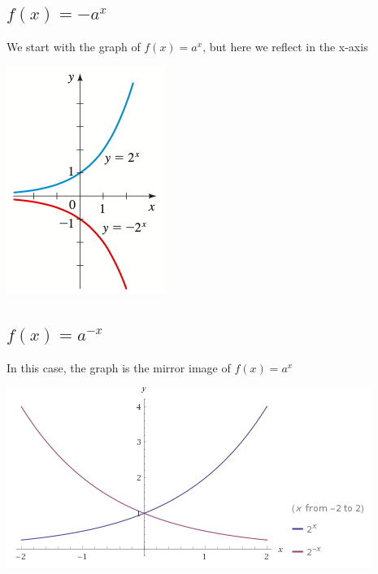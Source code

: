 \documentclass{book}
\begin{document}
	 \subsection{$f(x) = -a^x$}
	 We start with the graph of $f(x) = a^x$, but here we reflect in the x-axis
	 
	 \includegraphics[scale=0.8]{exp2}
	 
	 \subsection{$f(x) = a^{-x}$}
	 In this case, the graph is the mirror image of $f(x) = a^x$
	 
	 \includegraphics[scale=0.8]{exp3}
	 
\end{document}
